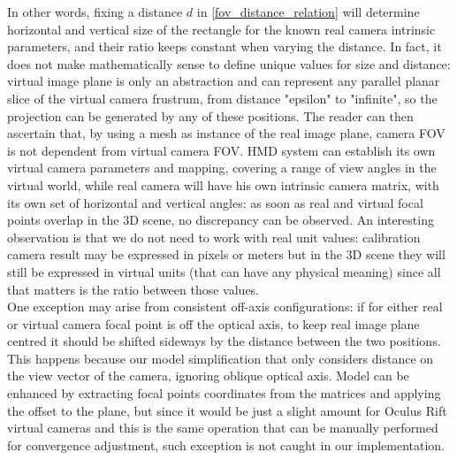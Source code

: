 In other words, fixing a distance $d$ in \ref{fov_distance_relation} will determine horizontal and vertical size of the rectangle for the known real camera intrinsic parameters, and their ratio keeps constant when varying the distance. In fact, it does not make mathematically sense to define unique values for size and distance: virtual image plane is only an abstraction and can represent any parallel planar slice of the virtual camera frustrum, from distance "epsilon" to "infinite", so the projection can be generated by any of these positions. The reader can then ascertain that, by using a mesh as instance of the real image plane, camera FOV is not dependent from virtual camera FOV. HMD system can establish its own virtual camera parameters and mapping, covering a range of view angles in the virtual world, while real camera will have his own intrinsic camera matrix, with its own set of horizontal and vertical angles: as soon as real and virtual focal points overlap in the 3D scene, no discrepancy can be observed. An interesting observation is that we do not need to work with real unit values: calibration camera result may be expressed in pixels or meters but in the 3D scene they will still be expressed in virtual units (that can have any physical meaning) since all that matters is the ratio between those values.\\
One exception may arise from consistent off-axis configurations: if for either real or virtual camera focal point is off the optical axis, to keep real image plane centred it should be shifted sideways by the distance between the two positions. This happens because our model simplification that only considers distance on the view vector of the camera, ignoring oblique optical axis. Model can be enhanced by extracting focal points coordinates from the matrices and applying the offset to the plane, but since it would be just a slight amount for Oculus Rift virtual cameras and this is the same operation that can be manually performed for convergence adjustment, such exception is not caught in our implementation.

